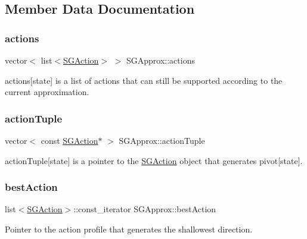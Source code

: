 \subsection{Member Data Documentation}
\mbox{\label{classSGApprox_a0fccecf0f5dbe7e9288e47182f180879}} 
\subsubsection{\texorpdfstring{actions}{actions}}
{\footnotesize\ttfamily vector$<$ list$<$\hyperlink{classSGAction}{S\+G\+Action}$>$ $>$ S\+G\+Approx\+::actions\hspace{0.3cm}{\ttfamily [private]}}

actions\mbox{[}state\mbox{]} is a list of actions that can still be supported according to the current approximation. \mbox{\label{classSGApprox_a507eb6895c5a99c5d1efba8107989187}} 
\subsubsection{\texorpdfstring{action\+Tuple}{actionTuple}}
{\footnotesize\ttfamily vector$<$ const \hyperlink{classSGAction}{S\+G\+Action}$\ast$ $>$ S\+G\+Approx\+::action\+Tuple\hspace{0.3cm}{\ttfamily [private]}}

action\+Tuple\mbox{[}state\mbox{]} is a pointer to the \hyperlink{classSGAction}{S\+G\+Action} object that generates pivot\mbox{[}state\mbox{]}. \mbox{\label{classSGApprox_a919c56cbea93b91c7ce4cd62201633e1}} 
\subsubsection{\texorpdfstring{best\+Action}{bestAction}}
{\footnotesize\ttfamily list$<$\hyperlink{classSGAction}{S\+G\+Action}$>$\+::const\+\_\+iterator S\+G\+Approx\+::best\+Action\hspace{0.3cm}{\ttfamily [private]}}

Pointer to the action profile that generates the shallowest direction. \mbox{\label{classSGApprox_a20454173d5c9af9bd24870d97f4e2b91}} 
